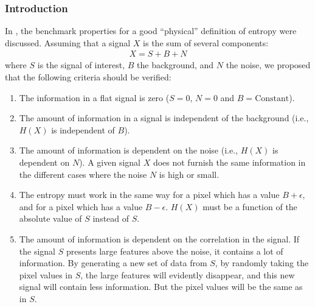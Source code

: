 \documentclass[11pt,a4paper]{article}
\begin{document}
\subsubsection{Introduction}
In \cite{starck:sta98_2,starck:sta99_2,starck:sta01_1}, 
the benchmark properties for a good ``physical''
definition of entropy were discussed.
Assuming that a signal $X$ is the sum of several components:
\begin{eqnarray}
X = S + B + N
\end{eqnarray}
where $S$ is the signal of interest, $B$ the background, and $N$ the noise,
we proposed that
the following criteria should be verified:
\begin{enumerate}
\item The information in a flat signal is zero ($S=0$, $N=0$ and 
$B=\mathrm{Constant}$). 
\item The amount of information in a signal is independent of the background
(i.e., $H(X)$ is independent of $B$).
\item The amount of information is dependent on the noise 
(i.e., $H(X)$ is dependent on $N$). 
A given signal $X$ does not furnish the  same information in the different
cases where the noise $N$ is high or small.
\item The entropy must work in the same way for a pixel which
has a value $B + \epsilon$, and
for a pixel which has a value $B - \epsilon$.
$H(X)$ must be a function of the absolute value of $S$ instead of $S$.
\item The amount of information is dependent on the correlation in the signal.
If the signal $S$  presents large features above the noise, it contains
a lot of information. By generating a new set of  data from $S$, by 
randomly taking the pixel values in $S$, the large features will
evidently disappear, and this new signal will contain less information.
But the pixel values will be the same as in $S$.
\end{enumerate}
\end{document}
